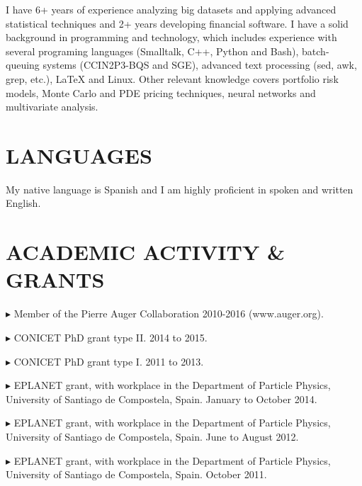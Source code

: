 \documentclass[letterpaper]{article}
\renewenvironment{itemize}{
  \begin{list}{}{
    \setlength{\leftmargin}{1.5em}
  }
}{
  \end{list}
}
\begin{document}
I have 6+ years of experience analyzing big datasets and applying advanced statistical techniques and 2+ years developing financial software. I have a solid background in programming and technology, which includes experience with several programing languages (Smalltalk, C++, Python and Bash), batch-queuing systems (CCIN2P3-BQS and SGE), advanced text processing (sed, awk, grep, etc.), \LaTeX{} and Linux. Other relevant knowledge covers portfolio risk models, Monte Carlo and PDE pricing techniques, neural networks and multivariate analysis.


\section*{LANGUAGES}

My native language is Spanish and I am highly proficient in spoken and written English.

\section*{ACADEMIC ACTIVITY \& GRANTS} 
   \begin{itemize} \itemsep -0pt  %
   \item $\blacktriangleright$ Member of the Pierre Auger Collaboration 2010-2016 (www.auger.org).
   \item $\blacktriangleright$ CONICET PhD grant type II. 2014 to 2015. 
   \item $\blacktriangleright$ CONICET PhD grant type I. 2011 to 2013. 
   \item $\blacktriangleright$ EPLANET grant, with workplace in the Department of Particle Physics, University of Santiago de Compostela, Spain. January to October 2014.
   \item $\blacktriangleright$ EPLANET grant, with workplace in the Department of Particle Physics, University of Santiago de Compostela, Spain. June to August 2012.
   \item $\blacktriangleright$ EPLANET grant, with workplace in the Department of Particle Physics, University of Santiago de Compostela, Spain. October 2011.
 \end{itemize}

 
\end{document}
